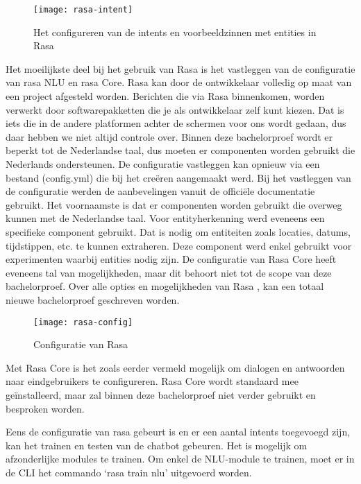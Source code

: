 \begin{figure}[H]
    \label{fig:rasa-intent}
    \centering
    \texttt{[image: rasa-intent]}
    \caption{Het configureren van de intents en voorbeeldzinnen met entities in Rasa}
\end{figure}

Het moeilijkste deel bij het gebruik van Rasa is het vastleggen van de configuratie van rasa NLU en rasa Core. Rasa kan door de ontwikkelaar volledig op maat van een project afgesteld worden. Berichten die via Rasa binnenkomen, worden verwerkt door softwarepakketten die je als ontwikkelaar zelf kunt kiezen. Dat is iets die in de andere platformen achter de schermen voor ons wordt gedaan, dus daar hebben we niet altijd controle over. Binnen deze bachelorproef wordt er beperkt tot de Nederlandse taal, dus moeten er componenten worden gebruikt die Nederlands ondersteunen. De configuratie vastleggen kan opnieuw via een bestand (config.yml) die bij het creëren aangemaakt werd. Bij het vastleggen van de configuratie werden de aanbevelingen vanuit de officiële documentatie gebruikt. Het voornaamste is dat er componenten worden gebruikt die overweg kunnen met de Nederlandse taal. Voor entityherkenning werd eveneens een specifieke component gebruikt. Dat is nodig om entiteiten zoals locaties, datums, tijdstippen, etc. te kunnen extraheren. Deze component werd enkel gebruikt voor experimenten waarbij entities nodig zijn.  De configuratie van Rasa Core heeft eveneens tal van mogelijkheden, maar dit behoort niet tot de scope van deze bachelorproef. Over alle opties en mogelijkheden van Rasa , kan een totaal nieuwe bachelorproef geschreven worden. 

\begin{figure}[H]
    \label{fig:rasa-config}
    \centering
    \texttt{[image: rasa-config]}
    \caption{Configuratie van Rasa}
\end{figure}

Met Rasa Core is het zoals eerder vermeld mogelijk om dialogen en antwoorden naar eindgebruikers te configureren. Rasa Core wordt standaard mee geïnstalleerd, maar zal binnen deze bachelorproef niet verder gebruikt en besproken worden.

Eens de configuratie van rasa gebeurt is en er een aantal intents toegevoegd zijn, kan het trainen en testen van de chatbot gebeuren. Het is mogelijk om afzonderlijke modules te trainen. Om enkel de NLU-module te trainen, moet er in de CLI het commando ‘rasa train nlu’ uitgevoerd worden.

